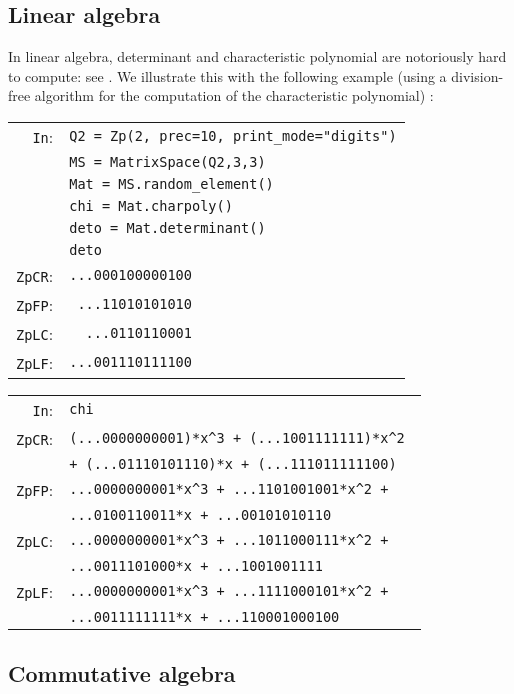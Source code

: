 \documentclass[sigconf]{acmart}
\newcommand{\cIn}{{\color{blue} \tt \phantom{Zp}In}:}
\newcommand{\cZpCR}{{\color{red} \tt ZpCR}:}
\newcommand{\cZpFP}{{\color{red} \tt ZpFP}:}
\newcommand{\cZpLC}{{\color{red} \tt ZpLC}:}
\newcommand{\cZpLF}{{\color{red} \tt ZpLF}:}
\theoremstyle{definition}
\begin{document}
\subsection{Linear algebra}

In linear algebra, determinant and 
characteristic polynomial are notoriously
hard to compute: see \cite{caruso-roe-vaccon:15, caruso-roe-vaccon:17}. We illustrate this with the following
example (using a division-free algorithm
for the computation of the characteristic polynomial) :

\bigskip


\begin{tabular}{rl}
\cIn
 & \verb?Q2 = Zp(2, prec=10, print_mode="digits")? \\
 & \verb?MS = MatrixSpace(Q2,3,3)? \\
 & \verb?Mat = MS.random_element()? \\
 & \verb?chi = Mat.charpoly()? \\
 & \verb?deto = Mat.determinant()? \\
 & \verb?deto? \\
\cZpCR
 & \verb?...000100000100? \\
\cZpFP
 & \verb? ...11010101010? \\
\cZpLC
 & \verb?  ...0110110001? \\
\cZpLF
 & \verb?...001110111100? \\
\end{tabular}


\begin{tabular}{rl}
\cIn
 & \verb?chi? \\
\cZpCR
 & \verb?(...0000000001)*x^3 + (...1001111111)*x^2 ?\\
 & \verb?+ (...01110101110)*x + (...111011111100)? \\
\cZpFP
 & \verb?...0000000001*x^3 + ...1101001001*x^2 + ?\\
 & \verb?...0100110011*x + ...00101010110? \\
\cZpLC
 & \verb?...0000000001*x^3 + ...1011000111*x^2 + ?\\
 & \verb?...0011101000*x + ...1001001111? \\
\cZpLF
 & \verb?...0000000001*x^3 + ...1111000101*x^2 + ?\\
 & \verb?...0011111111*x + ...110001000100? \\
\end{tabular}

\subsection{Commutative algebra}
\end{document}

